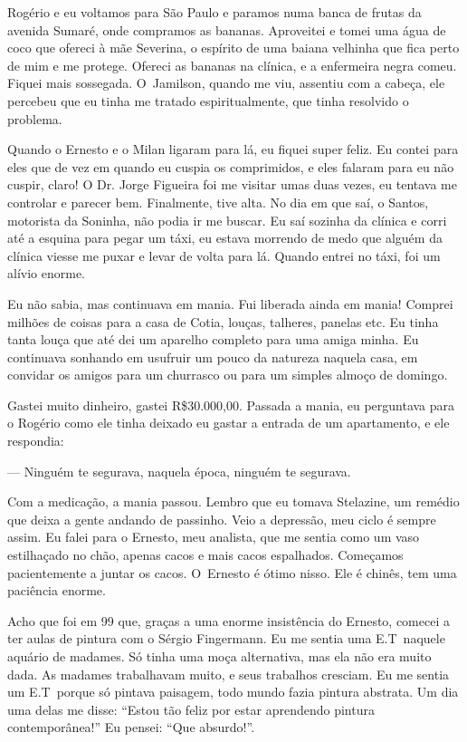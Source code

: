 Rogério e eu voltamos para São Paulo e paramos numa banca de frutas da
avenida Sumaré, onde compramos as bananas. Aproveitei e tomei uma água
de coco que ofereci à mãe Severina, o espírito de uma baiana velhinha
que fica perto de mim e me protege. Ofereci as bananas na clínica, e a
enfermeira negra comeu. Fiquei mais sossegada. O~Jamilson, quando me
viu, assentiu com a cabeça, ele percebeu que eu tinha me tratado
espiritualmente, que tinha resolvido o problema.

Quando o Ernesto e o Milan ligaram para lá, eu fiquei super feliz. Eu
contei para eles que de vez em quando eu cuspia os comprimidos, e eles
falaram para eu não cuspir, claro! O Dr. Jorge Figueira foi me visitar
umas duas vezes, eu tentava me controlar e parecer bem. Finalmente, tive
alta. No dia em que saí, o Santos, motorista da Soninha, não podia ir me
buscar. Eu saí sozinha da clínica e corri até a esquina para pegar um
táxi, eu estava morrendo de medo que alguém da clínica viesse me puxar e
levar de volta para lá. Quando entrei no táxi, foi um alívio enorme.

Eu não sabia, mas continuava em mania. Fui liberada ainda em mania!
Comprei milhões de coisas para a casa de Cotia, louças, talheres,
panelas etc. Eu tinha tanta louça que até dei um aparelho completo para
uma amiga minha. Eu continuava sonhando em usufruir um pouco da natureza
naquela casa, em convidar os amigos para um churrasco ou para um simples
almoço de domingo.

Gastei muito dinheiro, gastei R\$30.000,00. Passada a mania, eu
perguntava para o Rogério como ele tinha deixado eu gastar a entrada de
um apartamento, e ele respondia:

--- Ninguém te segurava, naquela época, ninguém te segurava.

Com a medicação, a mania passou. Lembro que eu tomava Stelazine, um
remédio que deixa a gente andando de passinho. Veio a depressão, meu
ciclo é sempre assim. Eu falei para o Ernesto, meu analista, que me
sentia como um vaso estilhaçado no chão, apenas cacos e mais cacos
espalhados. Começamos pacientemente a juntar os cacos. O~Ernesto é ótimo
nisso. Ele é chinês, tem uma paciência enorme.

Acho que foi em 99 que, graças a uma enorme insistência do Ernesto,
comecei a ter aulas de pintura com o Sérgio Fingermann. Eu me sentia uma
E.T\, naquele aquário de madames. Só tinha uma moça alternativa, mas ela
não era muito dada. As madames trabalhavam muito, e seus trabalhos
cresciam. Eu me sentia um E.T\, porque só pintava paisagem, todo mundo
fazia pintura abstrata. Um dia uma delas me disse: ``Estou tão feliz por
estar aprendendo pintura contemporânea!'' Eu pensei: ``Que absurdo!''.

